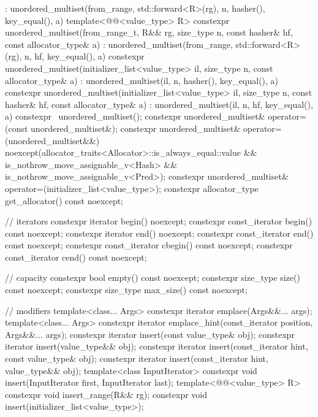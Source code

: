 \begin{codeblock}
{{        : unordered_multiset(from_range, std::forward<R>(rg),
                             n, hasher(), key_equal(), a) { }
    template<@@<value_type> R>
      constexpr unordered_multiset(from_range_t, R&& rg, size_type n, const hasher& hf,
                                   const allocator_type& a)
        : unordered_multiset(from_range, std::forward<R>(rg), n, hf, key_equal(), a) { }
    constexpr unordered_multiset(initializer_list<value_type> il, size_type n,
                                 const allocator_type& a)
      : unordered_multiset(il, n, hasher(), key_equal(), a) { }
    constexpr unordered_multiset(initializer_list<value_type> il, size_type n, const hasher& hf,
                                 const allocator_type& a)
      : unordered_multiset(il, n, hf, key_equal(), a) { }
    constexpr ~unordered_multiset();
    constexpr unordered_multiset& operator=(const unordered_multiset&);
    constexpr unordered_multiset& operator=(unordered_multiset&&)
      noexcept(allocator_traits<Allocator>::is_always_equal::value &&
               is_nothrow_move_assignable_v<Hash> && is_nothrow_move_assignable_v<Pred>);
    constexpr unordered_multiset& operator=(initializer_list<value_type>);
    constexpr allocator_type get_allocator() const noexcept;

    // iterators
    constexpr iterator       begin() noexcept;
    constexpr const_iterator begin() const noexcept;
    constexpr iterator       end() noexcept;
    constexpr const_iterator end() const noexcept;
    constexpr const_iterator cbegin() const noexcept;
    constexpr const_iterator cend() const noexcept;

    // capacity
    constexpr bool empty() const noexcept;
    constexpr size_type size() const noexcept;
    constexpr size_type max_size() const noexcept;

    // modifiers
    template<class... Args> constexpr iterator emplace(Args&&... args);
    template<class... Args>
      constexpr iterator emplace_hint(const_iterator position, Args&&... args);
    constexpr iterator insert(const value_type& obj);
    constexpr iterator insert(value_type&& obj);
    constexpr iterator insert(const_iterator hint, const value_type& obj);
    constexpr iterator insert(const_iterator hint, value_type&& obj);
    template<class InputIterator> constexpr void insert(InputIterator first, InputIterator last);
    template<@@<value_type> R>
      constexpr void insert_range(R&& rg);
    constexpr void insert(initializer_list<value_type>);

}}
\end{codeblock}
